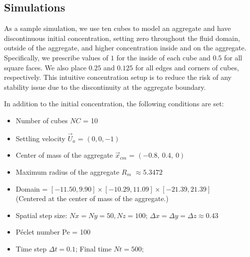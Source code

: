 \subsection{Simulations}
As a sample simulation, we use ten cubes to model an aggregate and have discontinuous initial concentration, setting zero throughout the fluid domain, outside of the aggregate, and higher concentration inside and on the aggregate. Specifically, we prescribe values of $1$ for the inside of each cube and $0.5$ for all square faces. We also place $0.25$ and $0.125$ for all edges and corners of cubes, respectively. 
This intuitive concentration setup is to reduce the risk of any stability issue due to the discontinuity at the aggregate boundary. 

In addition to the initial concentration, the following conditions are set:
\begin{framed}
\begin{itemize}
	\item Number of cubes $NC$ = 10
	\item Settling velocity $\vec{U}_a$ = $(0,0,-1)$
	\item Center of mass of the aggregate $\vec{x}_{cm}$ = $(-0.8, \  0.4, \ 0)$
	\item Maximum radius of the aggregate $R_m$ $\approx 5.3472$
	\item Domain = $[-11.50, 9.90] \times [-10.29, 11.09] \times [-21.39, 21.39]$\\
	(Centered at the center of mass of the aggregate.)
	\item Spatial step size: $Nx = Ny = 50, Nz = 100$; $\Delta x = \Delta y = \Delta z \approx 0.43$
	\item Péclet number Pe = 100
	\item Time step $\Delta t = 0.1$; Final time $Nt = 500$; 
\end{itemize}
\end{framed}

